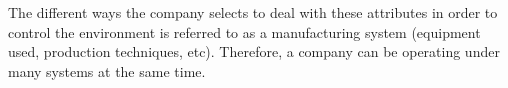 The different ways the company selects to deal with these attributes in order to control the environment is referred to as a manufacturing system (equipment used, production techniques, etc). Therefore, a company can be operating under many systems at the same time.
%
%
